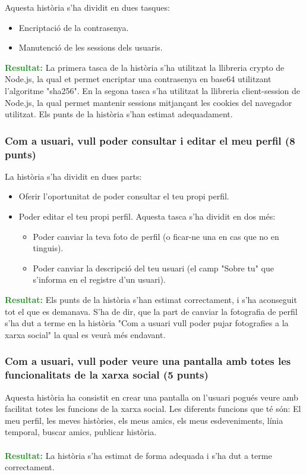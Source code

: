 \documentclass[11pt,catalan,listoffigures,listoftables]{tfgetsinf}
\begin{document}
Aquesta història s'ha dividit en dues tasques:
\begin{itemize}
\item Encriptació de la contrasenya.
\item Manutenció de les sessions dels usuaris.
\end{itemize}
\textcolor{forestgreen}{\textbf{Resultat:}} La primera tasca de la història s'ha utilitzat la llibreria crypto de Node.js, la qual et permet encriptar una contrasenya en base64 utilitzant l'algoritme "sha256". En la segona tasca s'ha utilitzat la llibreria client-session de Node.js, la qual permet mantenir sessions mitjançant les cookies del navegador utilitzat. Els punts de la història s'han estimat adequadament.

\subsubsection{Com a usuari, vull poder consultar i editar el meu perfil (8 punts)}

La història s'ha dividit en dues parts:
\begin{itemize}
\item Oferir l'oportunitat de poder consultar el teu propi perfil.
\item Poder editar el teu propi perfil. Aquesta tasca s'ha dividit en dos més:
\begin{itemize}
\item Poder canviar la teva foto de perfil (o ficar-ne una en cas que no en tinguis).
\item Poder canviar la descripció del teu usuari (el camp "Sobre tu" que s'informa en el registre d'un usuari).
\end{itemize}
\end{itemize}
\textcolor{forestgreen}{\textbf{Resultat:}} Els punts de la història s'han estimat correctament, i s'ha aconseguit tot el que es demanava. S'ha de dir, que la part de canviar la fotografia de perfil s'ha dut a terme en la història "Com a usuari vull poder pujar fotografies a la xarxa social" la qual es veurà més endavant.

\subsubsection{Com a usuari, vull poder veure una pantalla amb totes les funcionalitats de la xarxa social (5 punts)}

Aquesta història ha consistit en crear una pantalla on l'usuari pogués veure amb facilitat totes les funcions de la xarxa social. Les diferents funcions que té són: El meu perfil, les meves històries, els meus amics, els meus esdeveniments, línia temporal, buscar amics, publicar història.\\ \\
\textcolor{forestgreen}{\textbf{Resultat:}} La història s'ha estimat de forma adequada i s'ha dut a terme correctament.
\end{document}
